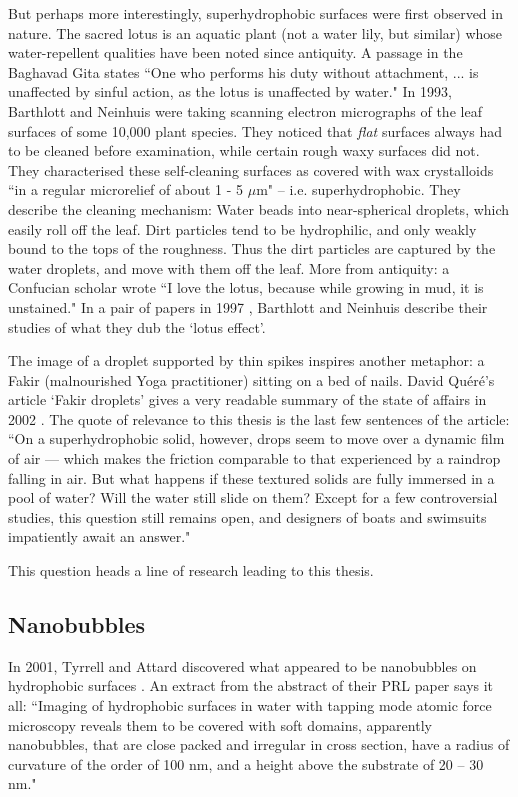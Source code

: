 \documentclass[a4paper]{report}
\begin{document}
But perhaps more interestingly, superhydrophobic surfaces were first observed in nature. The sacred lotus is an aquatic plant (not a water lily, but similar) whose water-repellent qualities have been noted since antiquity.  A passage in the Baghavad Gita states ``One who performs his duty without attachment, ... is unaffected by sinful action, as the lotus is unaffected by water."
In 1993, Barthlott and Neinhuis were taking scanning electron micrographs of the leaf surfaces of some 10,000 plant species.  They noticed that \emph{flat} surfaces always had to be cleaned before examination, while certain rough waxy surfaces did not.  They characterised these self-cleaning surfaces as covered with wax crystalloids ``in a regular microrelief of about 1 - 5 $\mu$m" -- i.e. superhydrophobic.  They describe the cleaning mechanism: Water beads into near-spherical droplets, which easily roll off the leaf.  Dirt particles tend to be hydrophilic, and only weakly bound to the tops of the roughness.  Thus the dirt particles are captured by the water droplets, and move with them off the leaf.  More from antiquity: a Confucian scholar wrote ``I love the lotus, because while growing in mud, it is unstained." In a pair of papers in 1997 \cite{BarthlottNeinhuis1997,NeinhuisBarthlott1997}, Barthlott and Neinhuis describe their studies of what they dub the `lotus effect'.

The image of a droplet supported by thin spikes inspires another metaphor: a Fakir (malnourished Yoga practitioner) sitting on a bed of nails.  David Qu\'{e}r\'{e}'s article `Fakir droplets' gives a very readable summary of the state of affairs in 2002 \cite{Quere2002}.  The quote of relevance to this thesis is the last few sentences of the article: ``On a superhydrophobic solid, however, drops seem to move over a dynamic film of air --- which makes the friction comparable to that experienced by a raindrop falling in air.  But what happens if these textured solids are fully immersed in a pool of water? Will the water still slide on them?  Except for a few controversial studies, this question still remains open, and designers of boats and swimsuits impatiently await an answer."

This question heads a line of research leading to this thesis.


\subsection{Nanobubbles}

In 2001, Tyrrell and Attard discovered what appeared to be nanobubbles on hydrophobic surfaces \cite{TyrrellAttard2001}.  An extract from the abstract of their PRL paper says it all: ``Imaging of hydrophobic surfaces in water with tapping mode atomic force microscopy reveals them to be covered with soft domains, apparently nanobubbles, that are close packed and irregular in cross section, have a radius of curvature of the order of 100 nm, and a height above the substrate of 20 -- 30 nm."  
\end{document}

